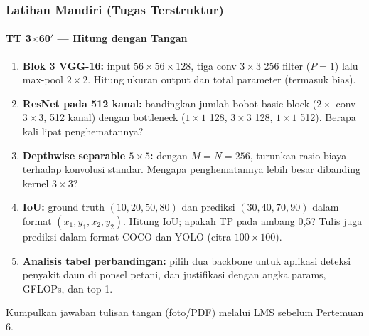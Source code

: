 \documentclass[t,aspectratio=169,xcolor=dvipsnames]{beamer}
\begin{document}
\begin{frame}
    \frametitle{Latihan Mandiri (Tugas Terstruktur)}
    \framesubtitle{TT 3$\times$60$'$ --- Hitung dengan Tangan}
    \footnotesize

    \begin{enumerate}
        \item \textbf{Blok 3 VGG-16:} input $56\times56\times128$, tiga conv $3\times3$ 256 filter ($P=1$) lalu max-pool $2\times2$. Hitung ukuran output dan total parameter (termasuk bias).
        \item \textbf{ResNet pada 512 kanal:} bandingkan jumlah bobot basic block ($2\times$ conv $3\times3$, 512 kanal) dengan bottleneck ($1\times1$ 128, $3\times3$ 128, $1\times1$ 512). Berapa kali lipat penghematannya?
        \item \textbf{Depthwise separable $5\times5$:} dengan $M=N=256$, turunkan rasio biaya terhadap konvolusi standar. Mengapa penghematannya lebih besar dibanding kernel $3\times3$?
        \item \textbf{IoU:} ground truth $(10,20,50,80)$ dan prediksi $(30,40,70,90)$ dalam format $(x_1,y_1,x_2,y_2)$. Hitung IoU; apakah TP pada ambang 0,5? Tulis juga prediksi dalam format COCO dan YOLO (citra $100\times100$).
        \item \textbf{Analisis tabel perbandingan:} pilih dua backbone untuk aplikasi deteksi penyakit daun di ponsel petani, dan justifikasi dengan angka params, GFLOPs, dan top-1.
    \end{enumerate}
    \vspace{0.1cm}
    {\scriptsize\color{dlMute} Kumpulkan jawaban tulisan tangan (foto/PDF) melalui LMS sebelum Pertemuan 6.}
\end{frame}
\end{document}
